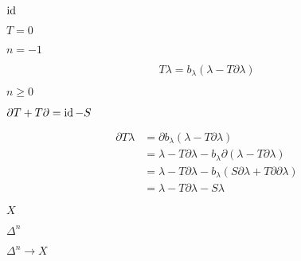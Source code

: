 \documentclass[10pt]{book}
\begin{document}
\begin{mdSnippets}
\begin{mdInlineSnippet}[38249f538b50785967877e7c5400afb8]
$\operatorname{id}$\end{mdInlineSnippet}%
\begin{mdInlineSnippet}[a166348ec58327d3a28160c617029872]%
$T = 0$\end{mdInlineSnippet}%
\begin{mdInlineSnippet}[c10b30af2ca82b997c02b71a76e1d330]%
$n=-1$\end{mdInlineSnippet}%
\begin{mdDisplaySnippet}[f02de521a4fb13db1d6e03de43febb41]%
\[%
T\lambda = b_\lambda(\lambda - T\partial\lambda)
\]%
\end{mdDisplaySnippet}%
\begin{mdInlineSnippet}[4b152567a12fdbcd2200b4dc72f4a7ca]%
$n \ge 0$\end{mdInlineSnippet}%
\begin{mdInlineSnippet}%
$\partial T + T \partial = \operatorname{id} - S$\end{mdInlineSnippet}%
\begin{mdDisplaySnippet}[1ce9efe0a0e7a0c3dd3695714c126293]%
\[%
\begin{aligned}
\partial T \lambda &= \partial b_\lambda (\lambda - T \partial \lambda) \\
&= \lambda - T\partial\lambda - b_\lambda \partial(\lambda - T\partial\lambda) \\
&= \lambda - T\partial\lambda - b_\lambda (S\partial\lambda + T\partial\partial\lambda) \\
&= \lambda - T\partial\lambda - S\lambda 
\end{aligned}
\]%
\end{mdDisplaySnippet}%
\begin{mdInlineSnippet}[02129bb861061d1a052c592e2dc6b383]%
$X$\end{mdInlineSnippet}%
\begin{mdInlineSnippet}[26ab61fa8024f78da62a405a1e574d8f]%
$\Delta^n$\end{mdInlineSnippet}%
\begin{mdInlineSnippet}%
$\Delta^n \to X$\end{mdInlineSnippet}%
\begin{mdInlineSnippet}[26ab61fa8024f78da62a405a1e574d8f]%

\end{mdInlineSnippet}
\end{mdSnippets}
\end{document}
